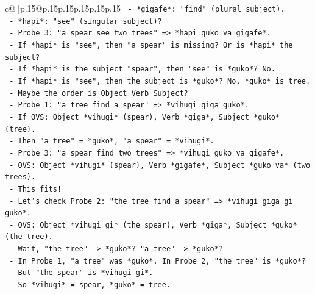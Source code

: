 \documentclass{article}
\begin{document}
{\begin{supertabular}{c@{$\;$}|p{.15\linewidth}@{}p{.15\linewidth}p{.15\linewidth}p{.15\linewidth}p{.15\linewidth}p{.15\linewidth}}
{{{\texttt{                        {-} *gigafe*: "find" (plural subject).} \\
\texttt{                        {-} *hapi*: "see" (singular subject)?} \\
\texttt{                          {-} Probe 3: "a spear see two trees" => *hapi guko va gigafe*.} \\
\texttt{                          {-} If *hapi* is "see", then "a spear" is missing? Or is *hapi* the subject?} \\
\texttt{                          {-} If *hapi* is the subject "spear", then "see" is *guko*? No.} \\
\texttt{                          {-} If *hapi* is "see", then the subject is *guko*? No, *guko* is tree.} \\
\texttt{                          {-} Maybe the order is Object Verb Subject?} \\
\texttt{                            {-} Probe 1: "a tree find a spear" => *vihugi giga guko*.} \\
\texttt{                            {-} If OVS: Object *vihugi* (spear), Verb *giga*, Subject *guko* (tree).} \\
\texttt{                            {-} Then "a tree" = *guko*, "a spear" = *vihugi*.} \\
\texttt{                            {-} Probe 3: "a spear find two trees" => *vihugi guko va gigafe*.} \\
\texttt{                            {-} OVS: Object *vihugi* (spear), Verb *gigafe*, Subject *guko va* (two trees).} \\
\texttt{                            {-} This fits!} \\
\texttt{                            {-} Let's check Probe 2: "the tree find a spear" => *vihugi giga gi guko*.} \\
\texttt{                            {-} OVS: Object *vihugi gi* (the spear), Verb *giga*, Subject *guko* (the tree).} \\
\texttt{                            {-} Wait, "the tree" {-}> *guko*? "a tree" {-}> *guko*?} \\
\texttt{                            {-} In Probe 1, "a tree" was *guko*. In Probe 2, "the tree" is *guko*?} \\
\texttt{                            {-} But "the spear" is *vihugi gi*.} \\
\texttt{                            {-} So *vihugi* = spear, *guko* = tree.} \\
}}}
\end{supertabular}}
\end{document}
